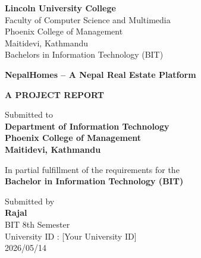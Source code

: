 \documentclass[12pt,a4paper]{report}
\begin{document}

\begin{titlepage}
  \centering
  \vspace*{0.3cm}

  \vspace{0.5cm}
  {\Large\bfseries Lincoln University College}\\[4pt]
  {\normalsize Faculty of Computer Science and Multimedia}\\[2pt]
  {\normalsize Phoenix College of Management}\\[2pt]
  {\normalsize Maitidevi, Kathmandu}\\[2pt]
  {\normalsize Bachelors in Information Technology (BIT)}

  \vspace{1.2cm}
  {\Large\bfseries NepalHomes -- A Nepal Real Estate Platform}

  \vspace{0.8cm}
  {\large\textbf{A PROJECT REPORT}}

  \vspace{0.8cm}
  {\normalsize Submitted to}\\[4pt]
  {\normalsize\bfseries
    Department of Information Technology\\
    Phoenix College of Management\\
    Maitidevi, Kathmandu}

  \vspace{0.6cm}
  {\normalsize In partial fulfillment of the requirements for the\\[4pt]
  \textbf{Bachelor in Information Technology (BIT)}}

  \vspace{1cm}
  {\normalsize Submitted by}\\[4pt]
  {\normalsize\bfseries Rajal}\\
  {\normalsize BIT 8th Semester}\\
  {\normalsize University ID : [Your University ID]}\\[6pt]
  {\normalsize 2026/05/14}
\end{titlepage}

\setcounter{page}{1}
\end{document}
